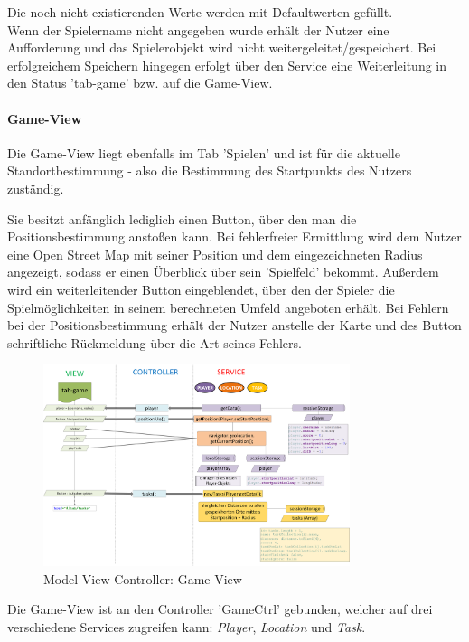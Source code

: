 Die noch nicht existierenden Werte werden mit Defaultwerten gefüllt.
\\
Wenn der Spielername nicht angegeben wurde erhält der Nutzer eine Aufforderung und das Spielerobjekt wird nicht weitergeleitet/gespeichert. Bei erfolgreichem Speichern hingegen erfolgt über den Service eine Weiterleitung in den Status 'tab-game' bzw. auf die Game-View.

\paragraph{Game-View}
Die Game-View liegt ebenfalls im Tab 'Spielen' und ist für die aktuelle Standortbestimmung - also die Bestimmung des Startpunkts des Nutzers zuständig.


Sie besitzt anfänglich lediglich einen Button, über den man die Positionsbestimmung anstoßen kann. Bei fehlerfreier Ermittlung wird dem Nutzer eine Open Street Map mit seiner Position und dem eingezeichneten Radius angezeigt, sodass er einen Überblick über sein 'Spielfeld' bekommt. Außerdem wird ein weiterleitender Button eingeblendet, über den der Spieler die Spielmöglichkeiten in seinem berechneten Umfeld angeboten erhält.
Bei Fehlern bei der Positionsbestimmung erhält der Nutzer anstelle der Karte und des Button schriftliche Rückmeldung über die Art seines Fehlers.
%
%
\begin{figure}[h]
\centering
\includegraphics[width=0.8\textwidth]{ref/images/03-game-tab.png}
\caption[Model-View-Controller: Game-View]{Model-View-Controller: Game-View}
\label{fig:MVC:Game-View}
\end{figure}
%
%


Die Game-View ist an den Controller 'GameCtrl' gebunden, welcher auf drei verschiedene Services zugreifen kann: \emph{Player}, \emph{Location} und \emph{Task}.

